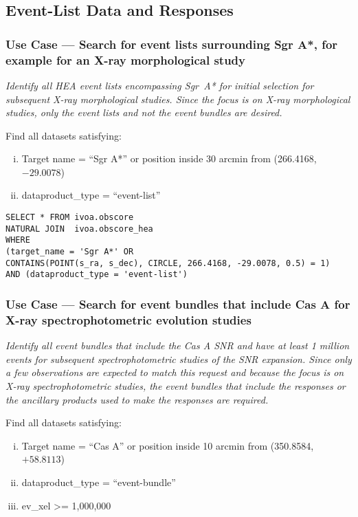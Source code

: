 \subsection{Event-List Data and Responses}


\subsubsection{Use Case --- Search for event lists surrounding Sgr A*, for example for an X-ray morphological study}

{\em Identify all \gls{HEA} event lists encompassing Sgr~A* for initial selection for subsequent X-ray morphological studies.  Since the focus is on X-ray morphological studies, only the event lists and not the event bundles are desired.\/}

\medskip
\noindent Find all datasets satisfying:
\begin{enumerate}[(i)]
  \item Target name = ``Sgr A*'' or position inside 30 arcmin from (266.4168, $-29.0078$)
  \item dataproduct\_type = ``event-list''
\end{enumerate}

\begin{verbatim}
SELECT * FROM ivoa.obscore
NATURAL JOIN  ivoa.obscore_hea
WHERE
(target_name = 'Sgr A*' OR
CONTAINS(POINT(s_ra, s_dec), CIRCLE, 266.4168, -29.0078, 0.5) = 1)
AND (dataproduct_type = 'event-list')
\end{verbatim}


\subsubsection{Use Case --- Search for event bundles that include Cas A for X-ray spectrophotometric evolution studies}

{\em Identify all event bundles that include the Cas A SNR and have at least 1 million events for subsequent spectrophotometric studies of the SNR expansion. Since only a few observations are expected to match this request and because the focus is on X-ray spectrophotometric studies, the event bundles that include the responses or the ancillary products used to make the responses are required.\/}

\medskip
\noindent Find all datasets satisfying:
\begin{enumerate}[(i)]
  \item Target name = ``Cas A'' or position inside 10 arcmin from (350.8584, $+58.8113$)
  \item dataproduct\_type = ``event-bundle''
  \item ev\_xel >= 1,000,000
\end{enumerate}

